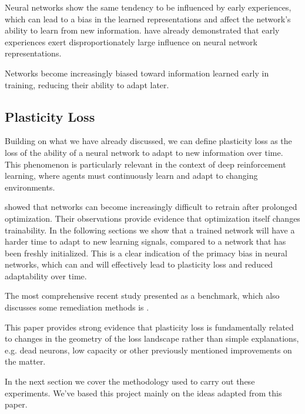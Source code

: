 Neural networks show the same tendency to be influenced by early experiences, which can lead to a bias in the learned representations and affect the network's ability to learn from new information. \citep{nikishin2022primacy} have already demonstrated that early experiences exert disproportionately large influence on neural network representations.

Networks become increasingly biased toward information learned early in training, reducing their ability to adapt later.


\subsection{Plasticity Loss}

Building on what we have already discussed, we can define plasticity loss as the loss of the ability of a neural network to adapt to new information over time. This phenomenon is particularly relevant in the context of deep reinforcement learning, where agents must continuously learn and adapt to changing environments.

\citep{ash2020warm} showed that networks can become increasingly difficult to retrain after prolonged optimization. Their observations provide evidence that optimization itself changes trainability.
In the following sections we show that a trained network will have a harder time to adapt to new learning signals, compared to a network that has been freshly initialized. This is a clear indication of the primacy bias in neural networks, which can and will effectively lead to plasticity loss and reduced adaptability over time.

The most comprehensive recent study presented as a benchmark, which also discusses some remediation methods is \citep{lyle2023understanding}.

This paper provides strong evidence that plasticity loss is fundamentally related to changes in the geometry of the loss landscape rather than simple explanations, e.g. dead neurons, low capacity or other previously mentioned improvements on the matter.

In the next section we cover the methodology used to carry out these experiments. We've based this project mainly on the ideas adapted from this paper.
